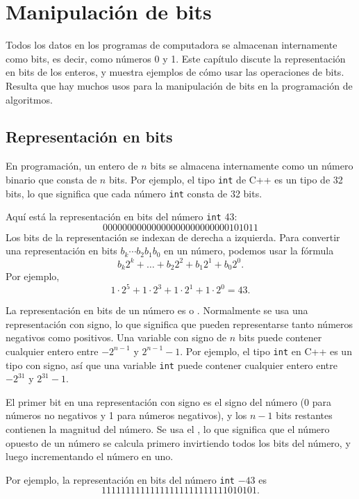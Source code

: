 \chapter{Manipulación de bits}

Todos los datos en los programas de computadora se almacenan internamente como bits,
es decir, como números 0 y 1.
Este capítulo discute la representación en bits
de los enteros, y muestra ejemplos
de cómo usar las operaciones de bits.
Resulta que hay muchos usos para
la manipulación de bits en la programación de algoritmos.

\section{Representación en bits}


En programación, un entero de $n$ bits se almacena
internamente como un número binario que consta de $n$ bits.
Por ejemplo, el tipo \texttt{int} de C++ es
un tipo de 32 bits, lo que significa que cada número
\texttt{int} consta de 32 bits.

Aquí está la representación en bits del
número \texttt{int} 43:
\[00000000000000000000000000101011\]
Los bits de la representación se indexan de derecha a izquierda.
Para convertir una representación en bits $b_k \cdots b_2 b_1 b_0$ en un número,
podemos usar la fórmula
\[b_k 2^k + \ldots + b_2 2^2 + b_1 2^1 + b_0 2^0.\]
Por ejemplo,
\[1 \cdot 2^5 + 1 \cdot 2^3 + 1 \cdot 2^1 + 1 \cdot 2^0 = 43.\]

La representación en bits de un número es
 o .
Normalmente se usa una representación con signo,
lo que significa que pueden representarse tanto números
negativos como positivos.
Una variable con signo de $n$ bits puede contener cualquier
entero entre $-2^{n-1}$ y $2^{n-1}-1$.
Por ejemplo, el tipo \texttt{int} en C++ es
un tipo con signo, así que una variable \texttt{int} puede contener cualquier
entero entre $-2^{31}$ y $2^{31}-1$.

El primer bit en una representación con signo
es el signo del número (0 para números no negativos
y 1 para números negativos), y
los $n-1$ bits restantes contienen la magnitud del número.
Se usa el , lo que significa que el
número opuesto de un número se calcula primero
invirtiendo todos los bits del número,
y luego incrementando el número en uno.

Por ejemplo, la representación en bits del
número \texttt{int} $-43$ es
\[11111111111111111111111111010101.\]

